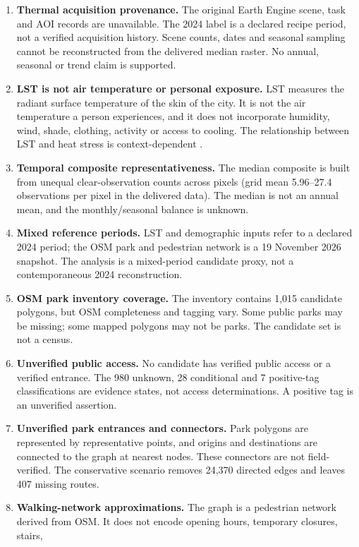\documentclass[times,twoside]{_Templates/MultiTargetManuscript}
\begin{document}
\begin{enumerate}
\item \textbf{Thermal acquisition provenance.} The original Earth Engine scene,
task and AOI records are unavailable. The 2024 label is a declared recipe period,
not a verified acquisition history. Scene counts, dates and seasonal sampling
cannot be reconstructed from the delivered median raster. No annual, seasonal or
trend claim is supported.
\item \textbf{LST is not air temperature or personal exposure.} LST measures the
radiant surface temperature of the skin of the city. It is not the air
temperature a person experiences, and it does not incorporate humidity, wind,
shade, clothing, activity or access to cooling. The relationship between LST
and heat stress is context-dependent \citep{schwarz2012}.
\item \textbf{Temporal composite representativeness.} The median composite is
built from unequal clear-observation counts across pixels (grid mean 5.96--27.4
observations per pixel in the delivered data). The median is not an annual mean,
and the monthly/seasonal balance is unknown.
\item \textbf{Mixed reference periods.} LST and demographic inputs refer to a
declared 2024 period; the OSM park and pedestrian network is a 19 November 2026
snapshot. The analysis is a mixed-period candidate proxy, not a contemporaneous
2024 reconstruction.
\item \textbf{OSM park inventory coverage.} The inventory contains 1,015
candidate polygons, but OSM completeness and tagging vary. Some public parks may
be missing; some mapped polygons may not be parks. The candidate set is not a
census.
\item \textbf{Unverified public access.} No candidate has verified public access
or a verified entrance. The 980 unknown, 28 conditional and 7 positive-tag
classifications are evidence states, not access determinations. A positive tag
is an unverified assertion.
\item \textbf{Unverified park entrances and connectors.} Park polygons are
represented by representative points, and origins and destinations are connected
to the graph at nearest nodes. These connectors are not field-verified. The
conservative scenario removes 24,370 directed edges and leaves 407 missing
routes.
\item \textbf{Walking-network approximations.} The graph is a pedestrian network
derived from OSM. It does not encode opening hours, temporary closures, stairs,

\end{enumerate}
\end{document}
